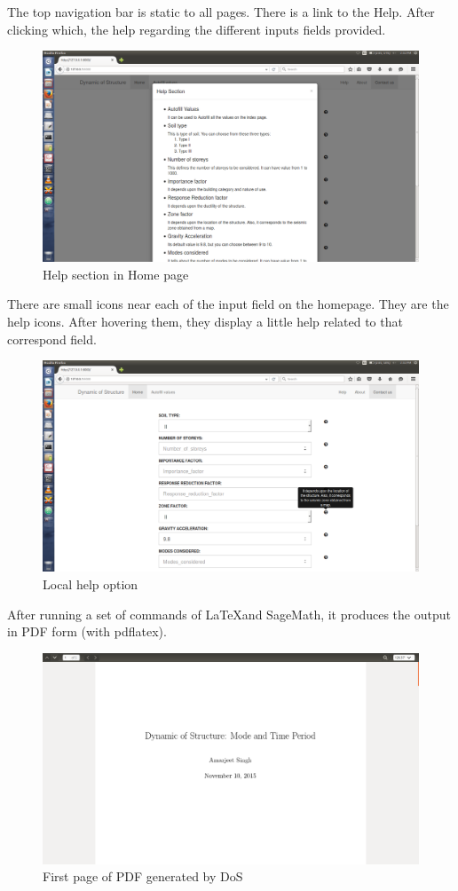 The top navigation bar is static to all pages. There is a link to the Help. 
After clicking which, the help regarding the different inputs fields 
provided.

\begin{figure} 
\centering \includegraphics[scale=0.31]{images/output/3.png}
\caption{Help section in Home page}
\end{figure}

There are small icons near each of the input field on the homepage. They are 
the help icons. After hovering them, they display a little help related to
that correspond field.
\begin{figure} 
\centering \includegraphics[scale=0.31]{images/output/4.png}
\caption{Local help option}
\end{figure}

After running a set of commands of \LaTeX and SageMath, it produces the
output in PDF form (with pdflatex).
\begin{figure} 
\centering \includegraphics[scale=0.31]{images/output/6.png}
\caption{First page of PDF generated by DoS}
\end{figure}

